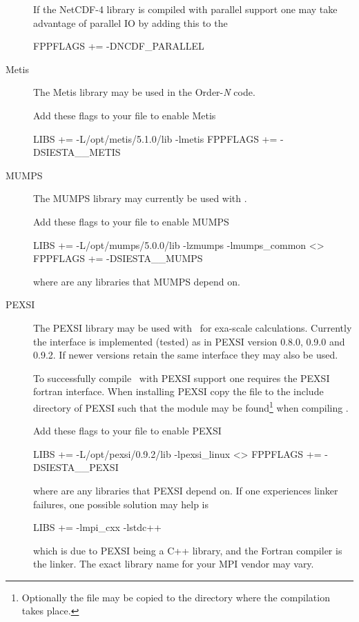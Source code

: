 \begin{description}
  
  If the NetCDF-4 library is compiled with parallel support one may
  take advantage of parallel IO by adding this to the  
\begin{shellexample}
  FPPFLAGS += -DNCDF_PARALLEL
\end{shellexample}


  \item[Metis]%
  The Metis library may be used in the Order-\emph N code. 

  Add these flags to your  file to enable Metis
\begin{shellexample}
  LIBS += -L/opt/metis/5.1.0/lib -lmetis
  FPPFLAGS += -DSIESTA__METIS
\end{shellexample}


  \item[MUMPS]%
  The MUMPS library may currently be used with \tsiesta.
  
  Add these flags to your  file to enable MUMPS
\begin{shellexample}
  LIBS += -L/opt/mumps/5.0.0/lib -lzmumps -lmumps_common <>
  FPPFLAGS += -DSIESTA__MUMPS
\end{shellexample}
  where \shell{<>} are any libraries that MUMPS depend on.


  \item[PEXSI]%
  The PEXSI library may be used with \siesta\ for exa-scale
  calculations. Currently the interface is implemented (tested) as in
  PEXSI version 0.8.0, 0.9.0 and 0.9.2. If newer versions retain the same
  interface they may also be used.

  To successfully compile \siesta\ with PEXSI support one requires the
  PEXSI fortran interface. When installing PEXSI copy the
   file to the include directory of
  PEXSI such that the module may be found\footnote{Optionally the file
      may be copied to the  directory where the compilation
      takes place.} when compiling \siesta.

  Add these flags to your  file to enable PEXSI
\begin{shellexample}
  LIBS += -L/opt/pexsi/0.9.2/lib -lpexsi_linux <>
  FPPFLAGS += -DSIESTA__PEXSI
\end{shellexample}
  where \shell{<>} are any libraries that PEXSI depend on. 
  If one experiences linker failures, one possible solution may help
  is
\begin{shellexample}
  LIBS += -lmpi_cxx -lstdc++
\end{shellexample}
  which is due to PEXSI being a C++ library, and the Fortran compiler
  is the linker. The exact library name for your MPI vendor may
  vary. 


\end{description}
